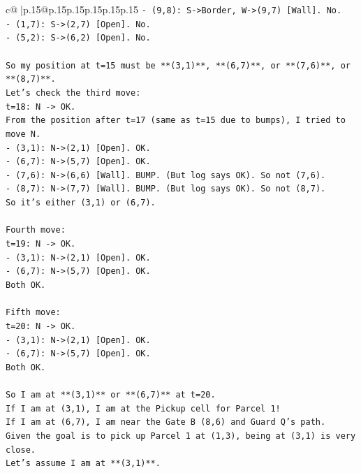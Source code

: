 \documentclass{article}
\begin{document}
{\begin{supertabular}{c@{$\;$}|p{.15\linewidth}@{}p{.15\linewidth}p{.15\linewidth}p{.15\linewidth}p{.15\linewidth}p{.15\linewidth}}
{{{\texttt{{-} (9,8): S{-}>Border, W{-}>(9,7) {[}Wall{]}. No.} \\
\texttt{{-} (1,7): S{-}>(2,7) {[}Open{]}. No.} \\
\texttt{{-} (5,2): S{-}>(6,2) {[}Open{]}. No.} \\
\\ 
\texttt{So my position at t=15 must be **(3,1)**, **(6,7)**, or **(7,6)**, or **(8,7)**.} \\
\texttt{Let's check the third move:} \\
\texttt{t=18: N {-}> OK.} \\
\texttt{From the position after t=17 (same as t=15 due to bumps), I tried to move N.} \\
\texttt{{-} (3,1): N{-}>(2,1) {[}Open{]}. OK.} \\
\texttt{{-} (6,7): N{-}>(5,7) {[}Open{]}. OK.} \\
\texttt{{-} (7,6): N{-}>(6,6) {[}Wall{]}. BUMP. (But log says OK). So not (7,6).} \\
\texttt{{-} (8,7): N{-}>(7,7) {[}Wall{]}. BUMP. (But log says OK). So not (8,7).} \\
\texttt{So it's either (3,1) or (6,7).} \\
\\ 
\texttt{Fourth move:} \\
\texttt{t=19: N {-}> OK.} \\
\texttt{{-} (3,1): N{-}>(2,1) {[}Open{]}. OK.} \\
\texttt{{-} (6,7): N{-}>(5,7) {[}Open{]}. OK.} \\
\texttt{Both OK.} \\
\\ 
\texttt{Fifth move:} \\
\texttt{t=20: N {-}> OK.} \\
\texttt{{-} (3,1): N{-}>(2,1) {[}Open{]}. OK.} \\
\texttt{{-} (6,7): N{-}>(5,7) {[}Open{]}. OK.} \\
\texttt{Both OK.} \\
\\ 
\texttt{So I am at **(3,1)** or **(6,7)** at t=20.} \\
\texttt{If I am at (3,1), I am at the Pickup cell for Parcel 1!} \\
\texttt{If I am at (6,7), I am near the Gate B (8,6) and Guard Q's path.} \\
\texttt{Given the goal is to pick up Parcel 1 at (1,3), being at (3,1) is very close.} \\
\texttt{Let's assume I am at **(3,1)**.} \\
}}}
\end{supertabular}}
\end{document}
